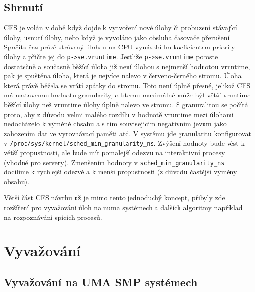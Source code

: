 \documentclass[a4paper,12pt]{article}
\begin{document}
%
%
%
%
%
%

\subsection{Shrnutí}

CFS je volán v době když dojde k vytvoření nové úlohy či probuzení stávající úlohy, usnutí úlohy, nebo když je vyvoláno jako obsluha časovače přerušení. Spočítá čas právě strávený úlohou na CPU vynásobí ho koeficientem priority úlohy a přičte jej do \verb#p->se.vruntime#. Jestliže \verb#p->se.vruntime# poroste dostatečně a současně běžící úloha již není úlohou s nejmenší hodnotou vruntime, pak je spuštěna úloha, která je nejvíce nalevo v červeno-černého stromu. Úloha která právě běžela se vrátí zpátky do stromu. Toto není úplně přesné, jelikož CFS má nastavenou hodnotu granularity, o kterou maximálně může být větší vruntime běžící úlohy než vruntime úlohy úplně nalevo ve stromu. S granuralitou se počítá proto, aby z důvodu velmi malého rozdílu v hodnotě vruntime mezi úlohami nedocházelo k výměně obsahu a s tím souvisejícím negativním jevům jako zahozením dat ve vyrovnávací paměti atd.
V systému jde granularitu konfigurovat v \verb#/proc/sys/kernel/sched_min_granularity_ns#. Zvýšení hodnoty bude vést k větší propustnosti, ale bude mít pomalejší odezvu na interaktivní procesy (vhodné pro servery). Zmenšením hodnoty  v \verb#sched_min_granularity_ns# docílíme k rychlejší odezvě a k menší propustnosti (z důvodu častější výměny obsahu).

Větší část CFS návrhu už je mimo tento jednoduchý koncept, přibyly zde rozšíření pro vyvažování úloh na numa systémech a dalších algoritmy například na rozpoznávání spících procesů.

\section{Vyvažování}

\subsection{Vyvažování na UMA SMP systémech}
\end{document}
